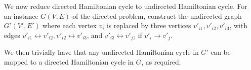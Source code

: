 \begin{enumerate}
\begin{enumerate}
    We now reduce directed Hamiltonian cycle to undirected Hamiltonian
    cycle. For an instance $G(V, E)$ of the directed problem,
    construct the undirected graph $G'(V', E')$ where each vertex $v_{i}$ is
    replaced by three vertices $v'_{i1}, v'_{i2}, v'_{i3}$, with edges
    $v'_{i1} \leftrightarrow v'_{i2}, v'_{i2} \leftrightarrow v'_{i3}$,
    and $v'_{i3} \leftrightarrow v'_{j1}$ if $v'_{i} \rightarrow
    v'_{j}$.

    We then trivially have that any undirected Hamiltonian cycle in
    $G'$ can be mapped to a directed Hamiltonian cycle in $G$, as
    required.
  \end{enumerate}
  
\end{enumerate}
